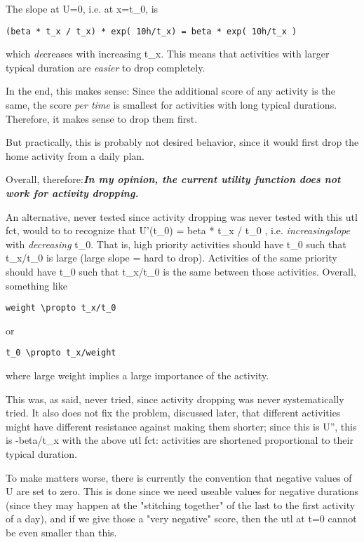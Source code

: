 \documentclass[a4paper,11pt]{report}
\begin{document}
The slope at U=0, i.e. at x=t\_0, is
\begin{verbatim}
(beta * t_x / t_x) * exp( 10h/t_x) = beta * exp( 10h/t_x )
\end{verbatim}

which \emph{de}creases with increasing t\_x. This means that activities with larger typical duration are \emph{easier} to drop completely.

In the end, this makes sense: Since the additional score of any activity is the same, the score \emph{per time} is smallest for activities with long typical durations. Therefore, it makes sense to drop them first.

But practically, this is probably not desired behavior, since it would first drop the home activity from a daily plan.

Overall, therefore:\emph{\textbf{In my opinion, the current utility function does not work for activity dropping.}}



An  alternative, never tested since activity dropping was never  tested with  this utl fct, would to to recognize that U'(t\_0) = beta *  t\_x / t\_0 ,  i.e. \emph{increasing}\emph{slope} with \emph{decreasing}  t\_0.  That is, high priority activities should have t\_0 such that  t\_x/t\_0 is  large (large slope = hard to drop). Activities of the  same priority  should have t\_0 such that t\_x/t\_0 is the same between  those activities.  Overall, something like
\begin{verbatim}
weight \propto t_x/t_0

\end{verbatim}

or
\begin{verbatim}
t_0 \propto t_x/weight
\end{verbatim}

where large weight implies a large importance of the activity.

This  was, as said, never tried, since activity dropping was never   systematically tried. It also does not fix the problem, discussed   later, that different activities might have different resistance  against  making them shorter; since this is U'', this is -beta/t\_x  with the  above utl fct: activities are shortened proportional to their  typical  duration.



To make matters worse, there is currently the  convention that  negative values of U are set to zero. This is done  since we need  useable values for negative durations (since they may  happen at the  "stitching together" of the last to the first activity of a  day), and  if we give those a "very negative" score, then the utl at t=0  cannot be  even smaller than this.
\end{document}
